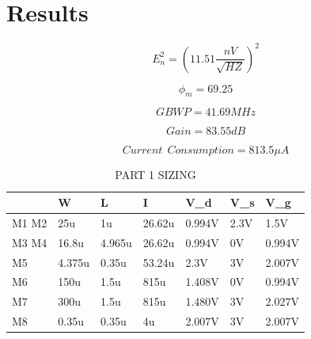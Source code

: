 

\section{Results} %
\label{sec:results}


\begin{equation}
  E_n^2=( 11.51 \frac {nV} { \sqrt{HZ}})^2
\end{equation}

\begin{equation}
  \phi_m=69.25
\end{equation}

\begin{equation}
  GBWP=41.69MHz
\end{equation}

\begin{equation}
  Gain=83.55dB
\end{equation}

\begin{equation}
  Current \ \ Consumption = 813.5 \mu A
\end{equation}


\begin{table}[]
\centering
\caption{PART 1 SIZING}
\label{my-label}
\begin{tabular}{|l|l|l|l|l|l|l|}
\hline
      & W      & L      & I      & V\_d   & V\_s & V\_g   \\ \hline
M1 M2 & 25u    & 1u     & 26.62u & 0.994V & 2.3V & 1.5V   \\ \hline
M3 M4 & 16.8u  & 4.965u & 26.62u & 0.994V & 0V   & 0.994V \\ \hline
M5    & 4.375u & 0.35u  & 53.24u & 2.3V   & 3V   & 2.007V \\ \hline
M6    & 150u   & 1.5u   & 815u   & 1.408V & 0V   & 0.994V \\ \hline
M7    & 300u   & 1.5u   & 815u   & 1.480V & 3V   & 2.027V \\ \hline
M8    & 0.35u  & 0.35u  & 4u     & 2.007V & 3V   & 2.007V \\ \hline
\end{tabular}
\end{table}


